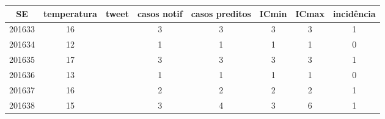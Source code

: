 \begin{tabular}{c|ccccccc}
  \hline
SE & temperatura & tweet & casos notif & casos preditos & ICmin & ICmax & incidência \\ 
  \hline
201633 & 16 &  & 3 & 3 & 3 & 3 & 1 \\ 
  201634 & 12 &  & 1 & 1 & 1 & 1 & 0 \\ 
  201635 & 17 &  & 3 & 3 & 3 & 3 & 1 \\ 
  201636 & 13 &  & 1 & 1 & 1 & 1 & 0 \\ 
  201637 & 16 &  & 2 & 2 & 2 & 2 & 1 \\ 
  201638 & 15 &  & 3 & 4 & 3 & 6 & 1 \\ 
   \hline
\end{tabular}
